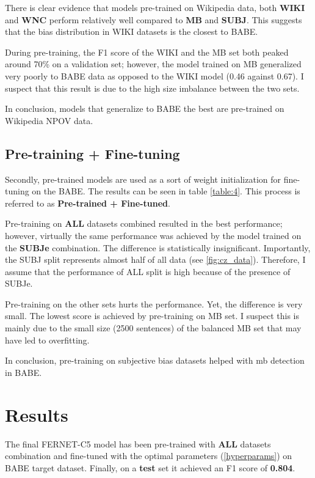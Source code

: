There is clear evidence that models pre-trained on Wikipedia data, both \textbf{WIKI} and \textbf{WNC} perform relatively well compared to \textbf{MB} and \textbf{SUBJ}. This suggests that the bias distribution in WIKI datasets is the closest to BABE.

During pre-training, the F1 score of the WIKI and the MB set both peaked around 70\% on a validation set; however, the model trained on MB generalized very poorly to BABE data as opposed to the WIKI model (0.46 against 0.67). I suspect that this result is due to the high size imbalance between the two sets.

In conclusion, models that generalize to BABE the best are pre-trained on Wikipedia NPOV data.

\subsection{Pre-training + Fine-tuning}
Secondly, pre-trained models are used as a sort of weight initialization for fine-tuning on the BABE. The results can be seen in table \ref{table:4}. This process is referred to as \textbf{Pre-trained + Fine-tuned}.

Pre-training on \textbf{ALL} datasets combined resulted in the best performance; however, virtually the same performance was achieved by the model trained on the \textbf{SUBJe} combination. The difference is statistically insignificant. Importantly, the SUBJ split represents almost half of all data (see \ref{fig:cz_data}). Therefore, I assume that the performance of ALL split is high because of the presence of SUBJe.

Pre-training on the other sets hurts the performance. Yet, the difference is very small. The lowest score is achieved by pre-training on MB set. I suspect this is mainly due to the small size (2500 sentences) of the balanced MB set that may have led to overfitting.

In conclusion, pre-training on subjective bias datasets helped with \gls{mb} detection in BABE.




\section{Results}
The final FERNET-C5 model has been pre-trained with \textbf{ALL} datasets combination and fine-tuned with the optimal parameters (\ref{hyperparams}) on BABE target dataset. Finally, on a \textbf{test} set it achieved an F1 score of \textbf{0.804}.

